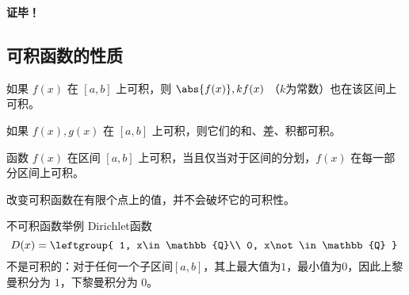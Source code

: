 \textbf{证毕！}

\subsection{可积函数的性质}

\begin{theorem}{}\label{the_InFun_2}
如果 $f(x)$ 在 $[a,b]$ 上可积，则 $\abs{f(x)},kf(x)$ （$k$为常数）也在该区间上可积。
\end{theorem}
\begin{theorem}{}
如果 $f(x),g(x)$ 在 $[a,b]$ 上可积，则它们的和、差、积都可积。
\end{theorem}

\begin{theorem}{}\label{the_InFun_1}
函数 $f(x)$ 在区间 $[a,b]$ 上可积，当且仅当对于区间的分划，$f(x)$ 在每一部分区间上可积。
\end{theorem}

\begin{theorem}{}
改变可积函数在有限个点上的值，并不会破坏它的可积性。
\end{theorem}

\begin{example}{不可积函数举例}
Dirichlet函数
\begin{equation}
D(x)=
\leftgroup{
    1, x\in\mathbb{Q}\\
    0, x\not\in\mathbb{Q}
}~
\end{equation}
不是可积的：对于任何一个子区间$[a, b]$，其上最大值为$1$，最小值为$0$，因此上黎曼积分为 $1$，下黎曼积分为 $0$。
\end{example}